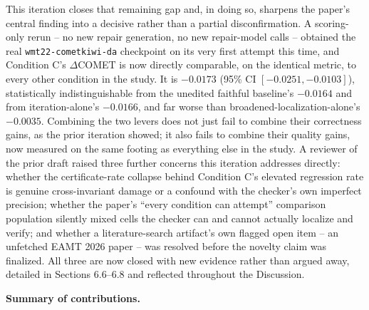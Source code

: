 \documentclass[11pt,letterpaper]{article}
\begin{document}
This iteration closes that remaining gap and, in doing so, sharpens the paper's central finding into a decisive rather than a partial disconfirmation. A scoring-only rerun -- no new repair generation, no new repair-model calls -- obtained the real \texttt{wmt22-cometkiwi-da} checkpoint on its very first attempt this time, and Condition C's $\Delta$COMET is now directly comparable, on the identical metric, to every other condition in the study. It is $-0.0173$ (95\% CI $[-0.0251,-0.0103]$), statistically indistinguishable from the unedited faithful baseline's $-0.0164$ and from iteration-alone's $-0.0166$, and far worse than broadened-localization-alone's $-0.0035$. Combining the two levers does not just fail to combine their correctness gains, as the prior iteration showed; it also fails to combine their quality gains, now measured on the same footing as everything else in the study. A reviewer of the prior draft raised three further concerns this iteration addresses directly: whether the certificate-rate collapse behind Condition C's elevated regression rate is genuine cross-invariant damage or a confound with the checker's own imperfect precision; whether the paper's ``every condition can attempt'' comparison population silently mixed cells the checker can and cannot actually localize and verify; and whether a literature-search artifact's own flagged open item -- an unfetched EAMT 2026 paper -- was resolved before the novelty claim was finalized. All three are now closed with new evidence rather than argued away, detailed in Sections 6.6--6.8 and reflected throughout the Discussion.

\textbf{Summary of contributions.}
\end{document}
